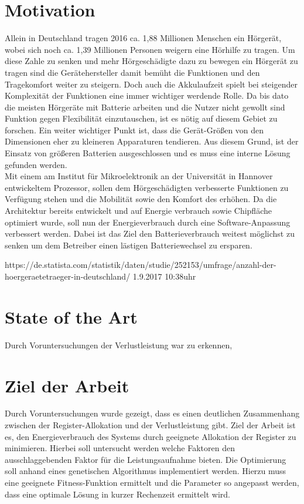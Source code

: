 \section{Motivation}
\label{sec:motivation}
Allein in Deutschland tragen 2016 ca. 1,88 Millionen Menschen ein Hörgerät, wobei sich noch ca. 1,39 Millionen Personen weigern eine Hörhilfe zu tragen. Um diese Zahle zu senken und mehr Hörgeschädigte dazu zu bewegen ein Hörgerät zu tragen sind die Gerätehersteller damit bemüht die Funktionen und den Tragekomfort weiter zu steigern. Doch auch die Akkulaufzeit spielt bei steigender Komplexität der Funktionen eine immer wichtiger werdende Rolle. Da bis dato die meisten Hörgeräte mit Batterie arbeiten und die Nutzer nicht gewollt sind Funktion gegen Flexibilität einzutauschen, ist es nötig auf diesem Gebiet zu forschen. Ein weiter wichtiger Punkt ist, dass die Gerät-Größen von den Dimensionen eher zu kleineren Apparaturen tendieren. Aus diesem Grund, ist der Einsatz von größeren Batterien ausgeschlossen und es muss eine interne Lösung gefunden werden.\\
Mit einem am Institut für Mikroelektronik an der Universität in Hannover entwickeltem Prozessor, sollen dem Hörgeschädigten verbesserte Funktionen zu Verfügung stehen und die Mobilität sowie den Komfort des erhöhen. Da die Architektur bereits entwickelt und auf Energie verbrauch sowie Chipfläche optimiert wurde, soll nun der Energieverbrauch durch eine Software-Anpassung verbessert werden.
Dabei ist das Ziel den Batterieverbrauch weitest möglichst zu senken um dem Betreiber einen lästigen Batteriewechsel zu ersparen.

https://de.statista.com/statistik/daten/studie/252153/umfrage/anzahl-der-hoergeraetetraeger-in-deutschland/ 1.9.2017 10:38uhr
\section{State of the Art}
\label{sec:objectives}
Durch Voruntersuchungen der Verlustleistung war zu erkennen, 

\section{Ziel der Arbeit}
\label{sec:ziele}
Durch Voruntersuchungen wurde gezeigt, dass es einen deutlichen Zusammenhang zwischen der Register-Allokation und der Verlustleistung gibt. Ziel der Arbeit ist es, den Energieverbrauch des Systems durch geeignete Allokation der Register zu minimieren. Hierbei soll untersucht werden welche Faktoren den ausschlaggebenden Faktor für die Leistungsaufnahme bieten. Die Optimierung soll anhand eines genetischen Algorithmus implementiert werden. Hierzu muss eine geeignete Fitness-Funktion ermittelt und die Parameter so angepasst werden, dass eine optimale Lösung in kurzer Rechenzeit ermittelt wird.

